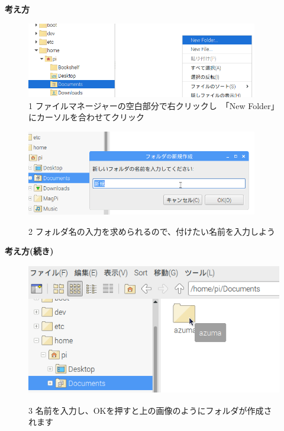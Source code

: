 \documentclass[a4paper,12pt]{jarticle}
\begin{document}
{\bf \large 考え方}
\begin{figure}[ht]
  \includegraphics[width=0.9\textwidth]{textbook-img034.png}
    \centering
    \\1
    ファイルマネージャーの空白部分で右クリックし　「New Folder」にカーソルを合わせてクリック
    \vspace{60pt}
  \begin{minipage}{\textwidth}
    \includegraphics[width=0.9\textwidth]{textbook-img036.png}
  \end{minipage}
    2
    フォルダ名の入力を求められるので、付けたい名前を入力しよう
\end{figure}
\clearpage
{\bf\large 考え方(続き)}
\begin{figure}[hb]
  \centering
  \includegraphics[width=11.398cm,height=5.72cm]{textbook-img038.png}
  \centering
  \begin{minipage}{13.001cm}
    3
    名前を入力し、OKを押すと上の画像のようにフォルダが作成されます
  \end{minipage}

\end{figure}
\end{document}
